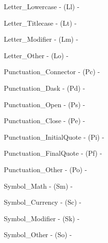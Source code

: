 \begin{DoxyItemize}
\item {\ttfamily Letter\+\_\+\+Lowercase} -\/ (Ll) -\/


\item {\ttfamily Letter\+\_\+\+Titlecase} -\/ (Lt) -\/


\item {\ttfamily Letter\+\_\+\+Modifier} -\/ (Lm) -\/


\item {\ttfamily Letter\+\_\+\+Other} -\/ (Lo) -\/


\item {\ttfamily Punctuation\+\_\+\+Connector} -\/ (Pc) -\/


\item {\ttfamily Punctuation\+\_\+\+Dask} -\/ (Pd) -\/


\item {\ttfamily Punctuation\+\_\+\+Open} -\/ (Ps) -\/


\item {\ttfamily Punctuation\+\_\+\+Close} -\/ (Pe) -\/


\item {\ttfamily Punctuation\+\_\+\+Initial\+Quote} -\/ (Pi) -\/


\item {\ttfamily Punctuation\+\_\+\+Final\+Quote} -\/ (Pf) -\/


\item {\ttfamily Punctuation\+\_\+\+Other} -\/ (Po) -\/


\item {\ttfamily Symbol\+\_\+\+Math} -\/ (Sm) -\/


\item {\ttfamily Symbol\+\_\+\+Currency} -\/ (Sc) -\/


\item {\ttfamily Symbol\+\_\+\+Modifier} -\/ (Sk) -\/


\item {\ttfamily Symbol\+\_\+\+Other} -\/ (So) -\/



\end{DoxyItemize}
